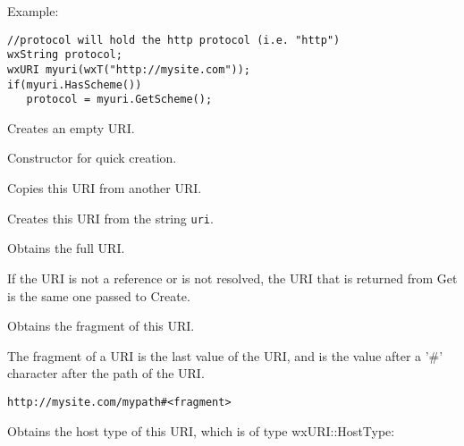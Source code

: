 Example:
\begin{verbatim}
//protocol will hold the http protocol (i.e. "http")
wxString protocol;
wxURI myuri(wxT("http://mysite.com"));
if(myuri.HasScheme())
   protocol = myuri.GetScheme();
\end{verbatim}

\label{wxuriwxuri}


Creates an empty URI.


Constructor for quick creation.



Copies this URI from another URI.



\label{wxuricreate}


Creates this URI from the string {\tt uri}.


\label{wxuriget}


Obtains the full URI.

If the URI is not a reference or is not resolved, 
the URI that is returned from Get is the same one 
passed to Create.

\label{wxurigetfragment}


Obtains the fragment of this URI.

The fragment of a URI is the last value of the URI,
and is the value after a '#' character after the path 
of the URI.

\tt{http://mysite.com/mypath\#<fragment>}

\label{wxurigethosttype}


Obtains the host type of this URI, which is of type
wxURI::HostType:

\twocolwidtha{7cm}
\begin{twocollist}\itemsep=0pt
\end{twocollist}


